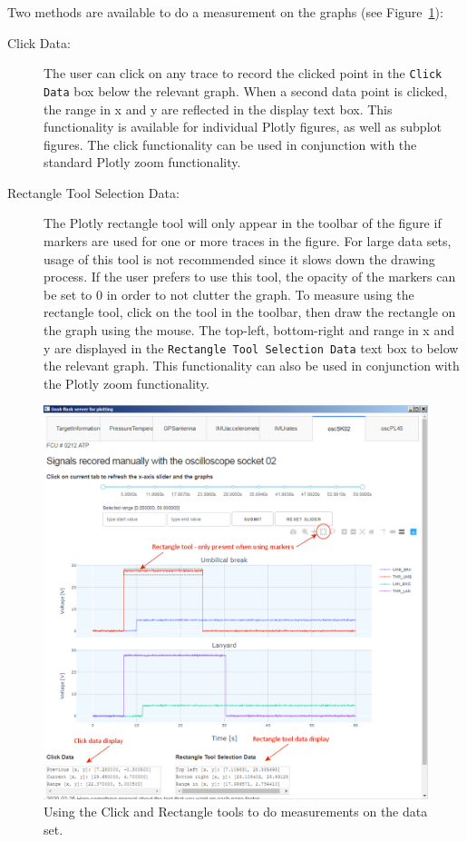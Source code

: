 Two methods are available to do a measurement on the graphs (see Figure~\ref{fig:dashview-rectangleDataSelect}):
\begin{description}
  \item [Click Data:] The user can click on any trace to record the clicked point in the \texttt{Click Data} box below the relevant graph. When a second data point is clicked, the range in x and y are reflected in the display text box. This functionality is available for individual Plotly figures, as well as subplot figures. The click functionality can be used in conjunction with the standard Plotly zoom functionality.
  \item [Rectangle Tool Selection Data:] The Plotly rectangle tool will only appear in the toolbar of the figure if markers are used for one or more traces in the figure. For large data sets, usage of this tool is not recommended since it slows down the drawing process. If the user prefers to use this tool, the opacity of the markers can be set to 0 in order to not clutter the graph. To measure using the rectangle tool, click on the tool in the toolbar, then draw the rectangle on the graph using the mouse. The top-left, bottom-right and range in x and y are displayed in the \texttt{Rectangle Tool Selection Data} text box to below the relevant graph. This functionality can also be used in conjunction with the Plotly zoom functionality.
\end{description}

\begin{figure}[h]
\centering
\includegraphics[width=\textwidth]{pic/dashview-rectangleDataSelect}
\caption{Using the Click and Rectangle tools to do measurements on the data set.
\label{fig:dashview-rectangleDataSelect}}
\end{figure}
